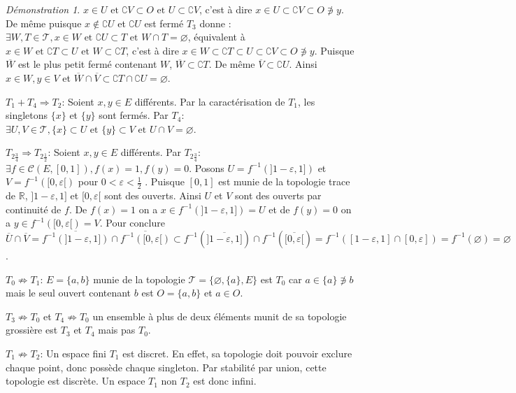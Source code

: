 \documentclass[a4paper, 11pt, french]{book}
\newenvironment{itemise}{\itemize}{\enditemize}
\theoremstyle{plain} %
\theoremstyle{definition} %
\theoremstyle{remark} %
\newtheorem*{demonstration}{Démonstration}
\newcommand{\1}{\mathds{1}}
\newcommand\vide{\varnothing}
\newcommand{\inv}[1]{#1^{-1}}
\newcommand\et{\text{ et }}
\newcommand{\R}{\mathbb{R}}
\renewcommand{\cal}[1]{\mathcal{#1}}
\newcommand{\scr}[1]{\mathscr{#1}}
\begin{document}
\begin{demonstration}
\begin{itemise}
		$x\in U\et\complement V\subset O\et U\subset\complement V$, c'est à dire
		$x\in U\subset\complement V\subset O\not\ni y$.
		De même puisque $x\notin\complement U$ et $\complement U$ est fermé $T_3$ donne :
		$\exists W, T\in\scr{T}, x\in W\et\complement U\subset T\et W\cap T=\vide$, équivalent à
		$x\in W\et\complement T\subset U\et W\subset\complement T$, c'est à dire
		$x\in W\subset\complement T\subset U\subset\complement V\subset O\not\ni y$.
		Puisque $\overline{W}$ est le plus petit fermé contenant $W$, $\overline{W}\subset\complement T$.
		De même $\overline{V}\subset\complement U$.
		Ainsi $x\in W, y\in V$ et $\overline{W}\cap\overline{V}\subset\complement T\cap\complement U=\vide$.
		\item[$T_1+T_4\Rightarrow T_2$:] Soient $x, y\in E$ différents.
		Par la caractérisation de $T_1$, les singletons $\{x\}$ et $\{y\}$ sont fermés.
		Par $T_4$: $\exists U, V\in\scr{T}, \{x\}\subset U\et\{y\}\subset V\et U\cap V=\vide$.
		\item[$T_{2\frac{3}{4}}\Rightarrow T_{2\frac{1}{2}}$:] Soient $x, y\in E$ différents.
		Par $T_{2\frac{3}{4}}$: $\exists f\in\cal{C}(E, [0, 1]), f(x)=1, f(y)=0$.
		Posons $U=\inv{f}(]1-\varepsilon, 1])$ et $V=\inv{f}([0, \varepsilon[)$ pour $0<\varepsilon<\frac{1}{2}$ .
		Puisque $[0, 1]$ est munie de la topologie trace de $\R$, $]1-\varepsilon, 1]$ et $[0, \varepsilon[$ sont des ouverts.
		Ainsi $U$ et $V$ sont des ouverts par continuité de $f$.
		De $f(x)=1$ on a $x\in\inv{f}(]1-\varepsilon, 1])=U$ et de $f(y)=0$ on a $y\in\inv{f}([0, \varepsilon[)=V$.
		Pour conclure
		$\overline{U}\cap\overline{V}
			=\overline{\inv{f}(]1-\varepsilon, 1])}\cap\overline{\inv{f}([0, \varepsilon[)}
			\subset\inv{f}(\overline{]1-\varepsilon, 1]})\cap\inv{f}(\overline{[0, \varepsilon[})
			=\inv{f}([1-\varepsilon, 1]\cap[0, \varepsilon])
			=\inv{f}(\vide)
			=\vide$.
		\item[$T_0\not\Rightarrow T_1$:] $E=\{a, b\}$ munie de la topologie $\scr{T}=\{\vide, \{a\}, E\}$ est $T_0$ car $a\in\{a\}\not\ni b$ mais le seul ouvert contenant $b$ est $O=\{a, b\}$ et $a\in O$.
		\item[$T_3\not\Rightarrow T_0$ et $T_4\not\Rightarrow T_0$] un ensemble à plus de deux éléments munit de sa topologie grossière est $T_3$ et $T_4$ mais pas $T_0$.
		\item[$T_1\not\Rightarrow T_2$:] Un espace fini $T_1$ est discret.
		En effet, sa topologie doit pouvoir exclure chaque point, donc possède chaque singleton.
		Par stabilité par union, cette topologie est discrète.
		Un espace $T_1$ non $T_2$ est donc infini.

\end{itemise}
\end{demonstration}
\end{document}
